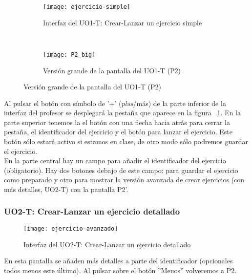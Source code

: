 \begin{figure}[H]
\begin{subfigure}[b]{\textwidth}
	\centering
	\texttt{[image: ejercicio-simple]}
	\caption{Interfaz del UO1-T: Crear-Lanzar un ejercicio simple}
	\label{fig:crear-lanzar-ejercicio-simple}
\end{subfigure}
\\
\begin{subfigure}[b]{\textwidth}
	\centering
	\texttt{[image: P2\_big]}
	\caption{Versión grande de la pantalla del UO1-T (P2)}
	\label{fig:crear-lanzar-ejercicio-simple-big}
\end{subfigure}

\label{diseno-e-implementacion:interfaces:profesor}
\end{figure}

Al pulsar el botón con símbolo de '+' (\textit{plus}/más) de la parte inferior de la interfaz del profesor se desplegará la pestaña que aparece en la figura ~\ref{fig:crear-lanzar-ejercicio-simple}. En la parte superior tenemos la el botón con una flecha hacia atrás para cerrar la pestaña, el identificador del ejercicio y el botón para lanzar el ejercicio. Este botón sólo estará activo si estamos en clase, de otro modo sólo podremos guardar el ejercicio.\\

En la parte central hay un campo para añadir el identificador del ejercicio (obligatorio). Hay dos botones debajo de este campo: para guardar el ejercicio como preparado y otro para mostrar la versión avanzada de crear ejercicios (con más detalles, UO2-T) con la pantalla P2'.\\

\subsubsection{UO2-T: Crear-Lanzar un ejercicio detallado}
\label{diseno-e-implementacion:interfaces:profesor:uo2-t}

\begin{figure}[H]
	\centering
	\texttt{[image: ejercicio-avanzado]}
	\caption{Interfaz del UO2-T: Crear-Lanzar un ejercicio detallado}
	\label{fig:crear-lanzar-ejercicio-avanzados}
\end{figure}

En esta pantalla se añaden más detalles a parte del identificador (opcionales todos menos este último). Al pulsar sobre el botón ''Menos'' volveremos a P2.\\

